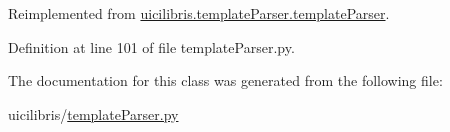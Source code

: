 \-Reimplemented from \hyperlink{classuicilibris_1_1templateParser_1_1templateParser_ac3d4f484ad1e51f0191b43c21f4a6873}{uicilibris.\-template\-Parser.\-template\-Parser}.



\-Definition at line 101 of file template\-Parser.\-py.



\-The documentation for this class was generated from the following file\-:\begin{DoxyCompactItemize}
\item 
uicilibris/\hyperlink{templateParser_8py}{template\-Parser.\-py}\end{DoxyCompactItemize}

